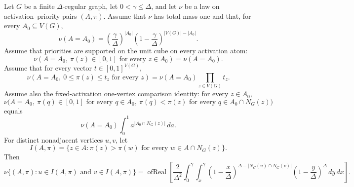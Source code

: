 \begin{helper}
Let \(G\) be a finite \(\Delta\)-regular graph, let \(0<\gamma\le\Delta\),
and let \(\nu\) be a law on activation--priority pairs \((A,\pi)\).  Assume
that \(\nu\) has total mass one and that, for every \(A_0\subseteq V(G)\),
\[
\nu(A=A_0)=
\left(\frac{\gamma}{\Delta}\right)^{|A_0|}
\left(1-\frac{\gamma}{\Delta}\right)^{|V(G)|-|A_0|}.
\]
Assume that priorities are supported on the unit cube on every activation
atom:
\[
\nu(A=A_0,\ \pi(z)\in[0,1]\text{ for every }z\in A_0)=\nu(A=A_0).
\]
Assume that for every vector \(t\in[0,1]^{V(G)}\),
\[
\nu(A=A_0,\ 0\le \pi(z)\le t_z\text{ for every }z)
=\nu(A=A_0)\prod_{z\in V(G)}t_z.
\]
Assume also the fixed-activation one-vertex comparison identity: for every
\(z\in A_0\),
\[
\nu\bigl(A=A_0,\ \pi(q)\in[0,1]\text{ for every }q\in A_0,\ 
\pi(q)<\pi(z)\text{ for every }q\in A_0\cap N_G(z)\bigr)
\]
equals
\[
\nu(A=A_0)\int_0^1 a^{|A_0\cap N_G(z)|}\,da .
\]
For distinct nonadjacent vertices \(u,v\), let
\[
I(A,\pi)=\{z\in A:\pi(z)>\pi(w)\text{ for every }w\in A\cap N_G(z)\}.
\]
Then
\[
\nu\{(A,\pi):u\in I(A,\pi)\text{ and }v\in I(A,\pi)\}
=
\operatorname{ofReal}\!\left[
\frac{2}{\Delta^2}\int_0^\gamma\int_x^\gamma
\left(1-\frac{x}{\Delta}\right)^{
\Delta-|N_G(u)\cap N_G(v)|}
\left(1-\frac{y}{\Delta}\right)^\Delta\,dy\,dx\right].
\]
\end{helper}
